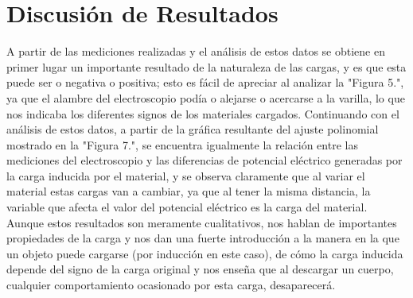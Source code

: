 \documentclass[10pt,journal]{IEEEtran}
\begin{document}
\section{Discusión de Resultados}
A partir de las mediciones realizadas y el análisis de estos datos se obtiene en primer lugar un importante resultado de la naturaleza de las cargas, y es que esta puede ser o negativa o positiva; esto es fácil de apreciar al analizar la "Figura 5.", ya que el alambre del electroscopio podía o alejarse o acercarse a la varilla, lo que nos indicaba los diferentes signos de los materiales cargados.
Continuando con el análisis de estos datos, a partir de la gráfica resultante del ajuste polinomial mostrado en la "Figura 7.", se encuentra igualmente la relación entre las mediciones del electroscopio y las diferencias de potencial eléctrico generadas por la carga inducida por el material, y se observa claramente que al variar el material estas cargas van a cambiar, ya que al tener la misma distancia, la variable que afecta el valor del potencial eléctrico es la carga del material.
Aunque estos resultados son meramente cualitativos, nos hablan de importantes propiedades de la carga y nos dan una fuerte introducción a la manera en la que un objeto puede cargarse (por inducción en este caso), de cómo la carga inducida depende del signo de la carga original y nos enseña que al descargar un cuerpo, cualquier comportamiento ocasionado por esta carga, desaparecerá.
\end{document}
